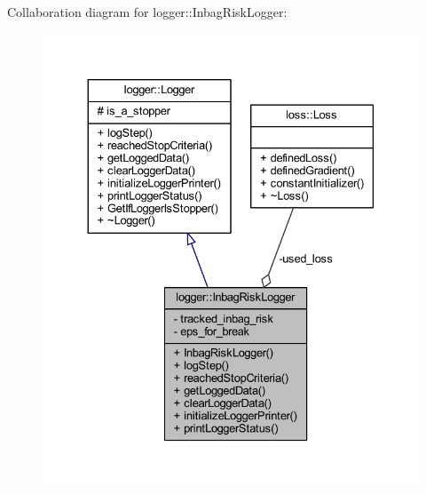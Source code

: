 Collaboration diagram for logger\+:\+:Inbag\+Risk\+Logger\+:\nopagebreak
\begin{figure}[H]
\begin{center}
\leavevmode
\includegraphics[width=330pt]{classlogger_1_1_inbag_risk_logger__coll__graph}
\end{center}
\end{figure}
